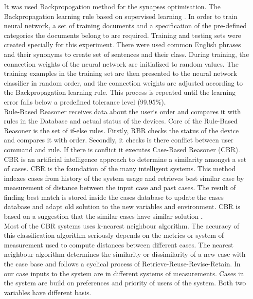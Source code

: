 \documentclass{llncs}
\begin{document}
    It was used Backpropogation method for the synapses optimisation.
    The Backpropagation learning rule based on supervised learning \cite{14}.
    In order to train neural network, a set of training documents and a specification of the pre-defined categories the
    documents belong to are required.
    Training and testing sets were created specially for this experiment.
    There were used common English phrases and their synonyms to create set of sentences and their class.
    During training, the connection weights of the neural network are initialized to random values.
    The training examples in the training set are then presented to the neural network classifier in random order, and
    the connection weights are adjusted according to the Backpropagation learning rule.
    This process is repeated until the learning error falls below a predefined tolerance level (99.95\%).\\
    Rule-Based Reasoner receives data about the user`s order and compares it with rules in the Database and actual status of the devices.
    Core of the Rule-Based Reasoner is the set of if-else rules.
    Firstly, RBR checks the status of the device and compares it with order.
    Secondly, it checks is there conflict between user command and rule.
    If there is conflict it executes Case-Based Reasoner (CBR).\\
    CBR is an artificial intelligence approach to determine a similarity amongst a set of cases.
    CBR is the foundation of the many intelligent systems.
    This method indexes cases from history of the system usage and retrieves best similar case by measurement of distance between the input case and past cases.
    The result of finding best match is stored inside the cases database to update the cases database and adapt old solution to the new variables and environment.
    CBR is based on a suggestion that the similar cases have similar solution \cite{7}.\\
    Most of the CBR systems uses k-nearest neighbour algorithm.
    The accuracy of this classification algorithm seriously depends on the metrics or system of measurement used to compute distances between different cases.
    The nearest neighbour algorithm determines the similarity or dissimilarity of a new case with the case base and follows a cyclical process of Retrieve-Reuse-Revise-Retain.
    In our case inputs to the system are in different systems of measurements.
    Cases in the system are build on preferences and priority of users of the system.
    Both two variables have different basis.
\end{document}
